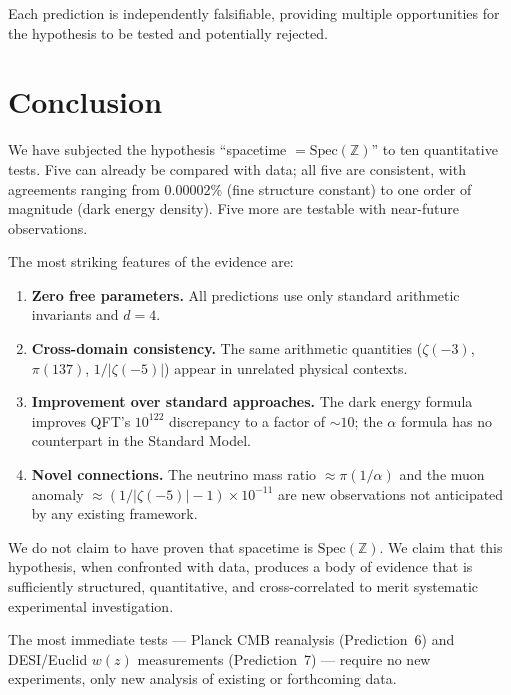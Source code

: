 \documentclass[11pt,a4paper]{article}
\newcommand{\Spec}{\mathrm{Spec}}
\begin{document}
Each prediction is independently falsifiable, providing multiple
opportunities for the hypothesis to be tested and potentially rejected.

\section{Conclusion}
\label{sec:conclusion}

We have subjected the hypothesis ``spacetime $= \Spec(\mathbb{Z})$''
to ten quantitative tests. Five can already be compared with data;
all five are consistent, with agreements ranging from $0.00002\%$
(fine structure constant) to one order of magnitude (dark energy
density). Five more are testable with near-future observations.

The most striking features of the evidence are:
\begin{enumerate}
\item \textbf{Zero free parameters.} All predictions use only
  standard arithmetic invariants and $d = 4$.
\item \textbf{Cross-domain consistency.} The same arithmetic
  quantities ($\zeta(-3)$, $\pi(137)$, $1/|\zeta(-5)|$) appear
  in unrelated physical contexts.
\item \textbf{Improvement over standard approaches.} The dark
  energy formula improves QFT's $10^{122}$ discrepancy to a
  factor of $\sim 10$; the $\alpha$ formula has no counterpart
  in the Standard Model.
\item \textbf{Novel connections.} The neutrino mass ratio $\approx
  \pi(1/\alpha)$ and the muon anomaly $\approx (1/|\zeta(-5)|-1)
  \times 10^{-11}$ are new observations not anticipated by any
  existing framework.
\end{enumerate}

We do not claim to have proven that spacetime is $\Spec(\mathbb{Z})$.
We claim that this hypothesis, when confronted with data, produces
a body of evidence that is sufficiently structured, quantitative,
and cross-correlated to merit systematic experimental investigation.

The most immediate tests --- Planck CMB reanalysis (Prediction~6)
and DESI/Euclid $w(z)$ measurements (Prediction~7) --- require
no new experiments, only new analysis of existing or forthcoming data.
\end{document}
